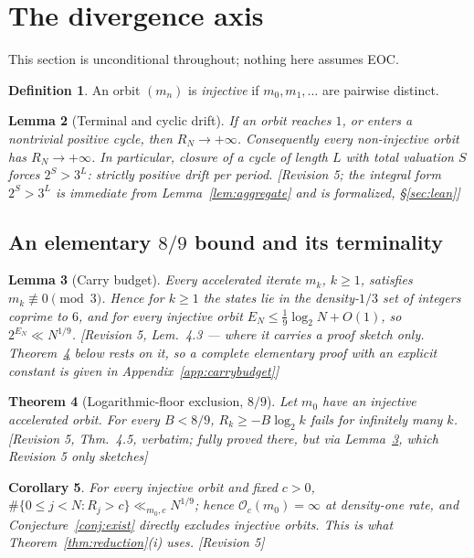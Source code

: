 \documentclass[11pt]{article}
\theoremstyle{plain}
\newtheorem{theorem}{Theorem}[section]
\newtheorem{lemma}[theorem]{Lemma}
\newtheorem{corollary}[theorem]{Corollary}
\theoremstyle{definition}
\newtheorem{definition}[theorem]{Definition}
\theoremstyle{remark}
\newcommand{\Occ}{\mathcal{O}}
\newcommand{\status}[1]{\textsf{\footnotesize[#1]}}
\begin{document}
\section{The divergence axis}\label{sec:divergence}

This section is unconditional throughout; nothing here assumes EOC.

\begin{definition}
An orbit $(m_n)$ is \emph{injective} if $m_0,m_1,\dots$ are pairwise distinct.
\end{definition}

\begin{lemma}[Terminal and cyclic drift]\label{lem:cycledrift}
If an orbit reaches $1$, or enters a nontrivial positive cycle, then $R_N\to+\infty$. Consequently
every non-injective orbit has $R_N\to+\infty$. In particular, closure of a cycle of length $L$ with
total valuation $S$ forces $2^S>3^L$: strictly positive drift per period.
\status{Revision 5; the integral form $2^S>3^L$ is immediate from Lemma~\ref{lem:aggregate} and is
formalized, \S\ref{sec:lean}}
\end{lemma}

\subsection{An elementary $8/9$ bound and its terminality}

\begin{lemma}[Carry budget]\label{lem:carrybudget}
Every accelerated iterate $m_k$, $k\ge1$, satisfies $m_k\not\equiv0\pmod 3$. Hence for $k\ge1$ the
states lie in the density-$1/3$ set of integers coprime to $6$, and for every injective orbit
$E_N\le\frac19\log_2 N+O(1)$, so $2^{E_N}\ll N^{1/9}$.
\status{Revision 5, Lem.~4.3 --- where it carries a proof \emph{sketch} only. Theorem~\ref{thm:89}
below rests on it, so a complete elementary proof with an explicit constant is given in
Appendix~\ref{app:carrybudget}}
\end{lemma}

\begin{theorem}[Logarithmic-floor exclusion, $8/9$]\label{thm:89}
Let $m_0$ have an injective accelerated orbit. For every $B<8/9$, $R_k\ge-B\log_2 k$ fails for
infinitely many $k$. \status{Revision 5, Thm.~4.5, verbatim; fully proved there, but via
Lemma~\ref{lem:carrybudget}, which Revision 5 only sketches}
\end{theorem}

\begin{corollary}\label{cor:injocc}
For every injective orbit and fixed $c>0$, $\#\{0\le j<N:R_j>c\}\ll_{m_0,c}N^{1/9}$; hence
$\Occ_c(m_0)=\infty$ at density-one rate, and Conjecture~\ref{conj:exist} directly excludes
injective orbits. This is what Theorem~\ref{thm:reduction}(i) uses. \status{Revision 5}
\end{corollary}
\end{document}
